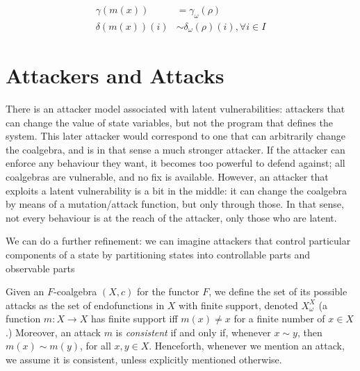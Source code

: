 

\begin{align}
\gamma(m(x))&=\gamma_\omega(\rho)\\
\delta(m(x))(i)&\sim \delta_\omega(\rho)(i), \forall i\in I
\end{align}


 
\section{Attackers and Attacks}
There is an attacker model associated with latent vulnerabilities: attackers that can change the value of state variables, but not the program that defines the system. This later attacker would correspond to one that can arbitrarily change the coalgebra, and is in that sense a much stronger attacker. If the attacker can enforce any behaviour they want, it becomes too powerful to defend against; all coalgebras are vulnerable, and no fix is available. However, an attacker that exploits a latent vulnerability is a bit in the middle: it can change the coalgebra by means of a mutation/attack function, but only through those. In that sense, not every behaviour is at the reach of the attacker, only those who are latent.

We can do a further refinement: we can imagine attackers that control particular components of a state by partitioning states into controllable parts and observable parts

\begin{definition}[Attack]
Given an $F$-coalgebra $(X,c)$ for the functor $F$, we define the set of its possible attacks as the set of endofunctions in $X$ with finite support, denoted $X^X_\omega$ (a function $m\colon X \rightarrow X$ has finite support iff $m(x)\neq x$ for a finite number of $x\in X$.) Moreover, an attack $m$ is \emph{consistent} if and only if, whenever $x\sim y$, then $m(x)\sim m(y)$, for all $x,y \in X$. Henceforth, whenever we mention an attack, we assume it is consistent, unless explicitly mentioned otherwise.
\end{definition}


